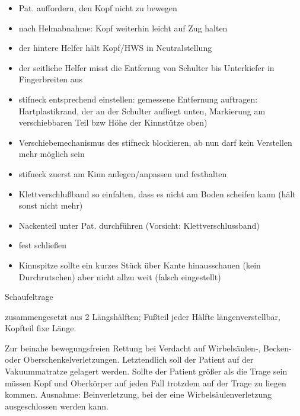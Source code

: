 \documentclass{article}
\begin{document}
\begin{itemize}
\item {\mdseries
Pat. auffordern, den Kopf nicht zu bewegen}

\item {\mdseries
nach Helmabnahme: Kopf weiterhin leicht auf Zug halten}

\item {\mdseries
der hintere Helfer h\"alt Kopf/HWS in Neutralstellung}

\item {\mdseries
der seitliche Helfer misst die Entfernug von Schulter bis Unterkiefer in
Fingerbreiten aus}

\item {\mdseries
stifneck entsprechend einstellen: gemessene Entfernung auftragen:
Hartplastikrand, der an der Schulter aufliegt unten, Markierung am
verschiebbaren Teil bzw H\"ohe der Kinnst\"utze oben)}

\item {\mdseries
Verschiebemechanismus des stifneck blockieren, ab nun darf kein
Verstellen mehr m\"oglich  sein }

\item {\mdseries
stifneck zuerst am Kinn anlegen/anpassen und festhalten}

\item {\mdseries
Klettverschlu{\ss}band so einfalten, dass es nicht am Boden scheifen
kann (h\"alt sonst nicht mehr)}

\item {\mdseries
Nackenteil unter Pat. durchf\"uhren (Vorsicht: Klettverschlussband)}

\item {\mdseries
fest schlie{\ss}en}

\end{itemize}
\begin{itemize}
\item[] Kinnspitze sollte ein kurzes St\"uck \"uber Kante hinausschauen
(kein Durchrutschen) aber nicht allzu weit (falsch eingestellt)

\end{itemize}
{\mdseries\color[rgb]{0.0,0.0,0.5019608}
Schaufeltrage}

{\mdseries
zusammengesetzt aus 2 L\"angsh\"alften; Fu{\ss}teil jeder H\"alfte
l\"angenverstellbar, Kopfteil fixe L\"ange.}

{\mdseries
Zur beinahe bewegungsfreien Rettung bei Verdacht auf Wirbels\"aulen-,
Becken- oder Oberschenkelverletzungen. Letztendlich soll der Patient
auf der Vakuummatratze gelagert werden. Sollte der Patient gr\"o{\ss}er
als die Trage sein m\"ussen Kopf und Oberk\"orper auf jeden Fall
trotzdem auf der Trage zu liegen kommen. Ausnahme: Beinverletzung, bei
der eine Wirbels\"aulenverletzung ausgeschlossen werden kann.}
\end{document}
